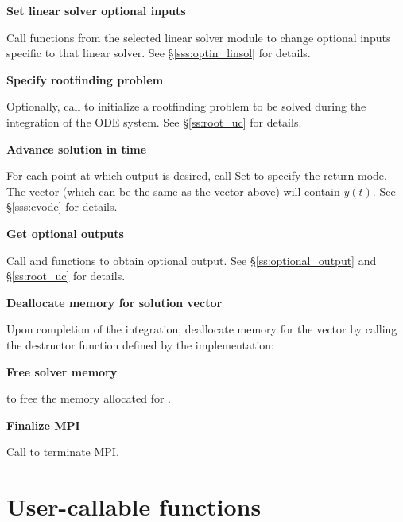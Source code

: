 \begin{Steps}
\item
  {\bf Set linear solver optional inputs}

  Call  functions from the selected linear solver module to
  change optional inputs specific to that linear solver.
  See \S\ref{sss:optin_linsol} for details.

\item
  {\bf Specify rootfinding problem}

  Optionally, call  to initialize a rootfinding problem
  to be solved during the integration of the ODE system.
  See \S\ref{ss:root_uc} for details.

\item
  {\bf Advance solution in time}

  For each point at which output is desired, call
  Set  to specify the return mode.
  The vector  (which can be the same as
  the vector  above) will contain $y(t)$.
  See \S\ref{sss:cvode} for details.
  
\item
  {\bf Get optional outputs}

  Call  and  functions to obtain optional output.
  See \S\ref{ss:optional_output} and \S\ref{ss:root_uc} for details.

\item
  {\bf Deallocate memory for solution vector}

  Upon completion of the integration, deallocate memory for the vector 
  by calling the destructor function defined by the {\nvector} implementation:

  {\s} 

  {\p} 
  
\item
  {\bf Free solver memory}

   to free the memory allocated for {\cvode}.
  
\item 
  {\bf {\p} Finalize MPI}

  Call  to terminate MPI.
  
\end{Steps}

\section{User-callable functions}\label{ss:cvode_fct_sim}

